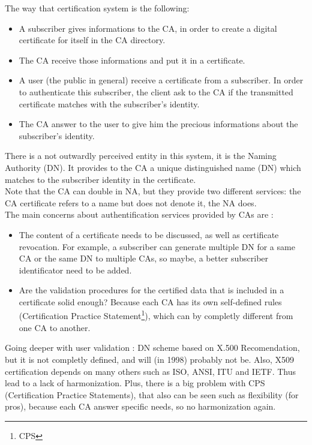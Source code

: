 \documentclass[journal, a4paper]{IEEEtran}
\begin{document}
The way that certification system is the following:
\begin{itemize}
	\item A subscriber gives informations to the CA, in order to create a digital certificate for itself in the CA directory.
	\item The CA receive those informations and put it in a certificate.
	\item A user (the public in general) receive a certificate from a subscriber. In order to authenticate this subscriber, the client ask to the CA if the transmitted certificate matches with the subscriber's identity.
	\item The CA answer to the user to give him the precious informations about the subscriber's identity.
\end{itemize}

There is a not outwardly perceived entity in this system, it is the Naming Authority (DN). It provides to the CA a unique distinguished name (DN) which matches to the subscriber identity in the certificate.\\
Note that the CA can double in NA, but they provide two different services: the CA certificate refers to a name but does not denote it, the NA does.\\

The main concerns about authentification services provided by CAs are :

\begin{itemize}
	\item The content of a certificate needs to be discussed, as well as certificate revocation. For example, a subscriber can generate multiple DN for a same CA or the same DN to multiple CAs, so maybe, a better subscriber identificator need to be added.
	\item Are the validation procedures for the certified data that is included in a certificate solid enough? Because each CA has its own self-defined rules (Certification Practice Statement\footnote{CPS}), which can by completly different from one CA to another.
\end{itemize}

Going deeper with user validation : DN scheme based on X.500 Recomendation, but it is not completly defined, and will (in 1998) probably not be. Also, X509 certification depends on many others such as ISO, ANSI, ITU and IETF. Thus lead to a lack of harmonization.
Plus, there is a big problem with CPS (Certification Practice Statements), that also can be seen such as flexibility (for pros), because each CA answer specific needs, so no harmonization again.
\end{document}
